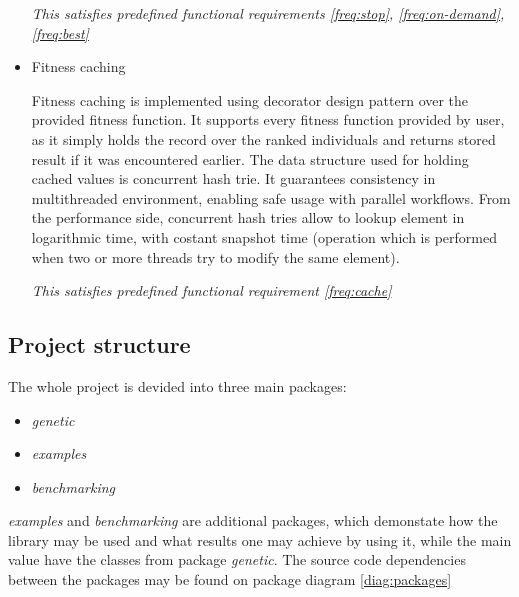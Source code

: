 \begin{itemize}
\smallskip\textit{This satisfies predefined functional requirements \ref{freq:stop}, \ref{freq:on-demand}, \ref{freq:best}}

\medbreak

\item Fitness caching

Fitness caching is implemented using decorator design pattern over the provided fitness function. It supports every fitness function provided by user, as it simply holds the record over the ranked individuals and returns stored result if it was encountered earlier. The data structure used for holding cached values is concurrent hash trie. It guarantees consistency in multithreaded environment, enabling safe usage with parallel workflows. From the performance side, concurrent hash tries allow to lookup element in logarithmic time, with costant snapshot time \cite{hash_tries} (operation which is performed when two or more threads try to modify the same element).

\smallskip\textit{This satisfies predefined functional requirement \ref{freq:cache}}
 
\medbreak


\end{itemize}

\subsection{Project structure}

The whole project is devided into three main packages:
\begin{itemize}
\item \textit{genetic}
\item \textit{examples}
\item \textit{benchmarking}
\end{itemize}

\textit{examples} and \textit{benchmarking} are additional packages, which demonstate how the library may be used and what results one may achieve by using it, while the main value have the classes from package \textit{genetic}. The source code dependencies between the packages may be found on package diagram \ref{diag:packages}

